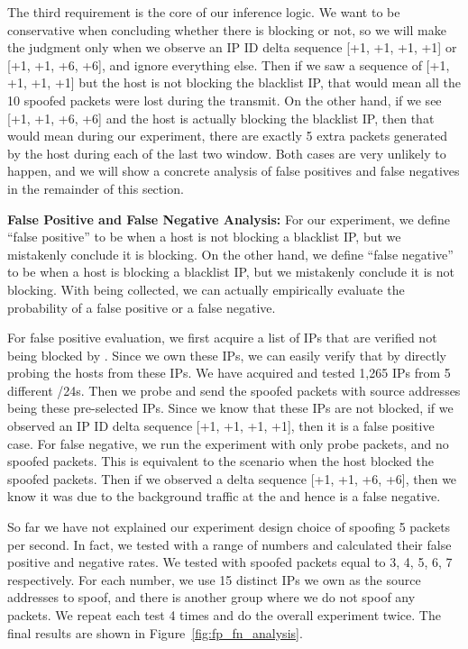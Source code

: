 The third requirement is the core of our inference logic. We want to be
conservative when concluding whether there is blocking or not, so we will
make the judgment only when we observe an IP ID delta sequence [+1, +1, +1,
+1] or [+1, +1, +6, +6], and ignore everything else. Then if we saw a
sequence of [+1, +1, +1, +1] but the host is not blocking the blacklist IP,
that would mean all the 10 spoofed packets were lost during the transmit. On
the other hand, if we see [+1, +1, +6, +6] and the host is actually blocking
the blacklist IP, then that would mean during our experiment, there are
exactly 5 extra packets generated by the host during each of the last two
window. Both cases are very unlikely to happen, and we will show a concrete
analysis of false positives and false negatives in the remainder of this section.


\textbf{False Positive and False Negative Analysis: }
For our experiment, we define ``false positive'' to be when a host is not
blocking a blacklist IP, but we mistakenly conclude it is blocking. On the
other hand, we define ``false negative'' to be when a host is blocking a
blacklist IP, but we mistakenly conclude it is not blocking. With
{} being collected, we can actually empirically evaluate the
probability of a false positive or a false negative.

For false positive evaluation, we first acquire a list of IPs that are verified
not being blocked by {}. Since we own these IPs, we can easily verify
that by directly probing the hosts from these IPs. We have acquired and tested
1,265 IPs from 5 different /24s. Then we probe {} and send the
spoofed packets with source addresses being these pre-selected IPs. Since we
know that these IPs are not blocked, if we observed an IP ID delta sequence
[+1, +1, +1, +1], then it is a false positive case. For false negative, we run
the experiment with only probe packets, and no spoofed packets. This is
equivalent to the scenario when the host blocked the spoofed packets. Then if
we observed a delta sequence [+1, +1, +6, +6], then we know it was due to the
background traffic at the {} and hence is a false negative.

So far we have not explained our experiment design choice of spoofing 5 packets
per second. In fact, we tested with a range of numbers and calculated
their false positive and negative rates. We tested with spoofed packets equal
to 3, 4, 5, 6, 7 respectively. For each number, we use 15 distinct IPs we own
as the source addresses to spoof, and there is another group where we do not
spoof any packets. We repeat each test 4 times and do the overall experiment
twice. The final results are shown in Figure~\ref{fig:fp_fn_analysis}.


